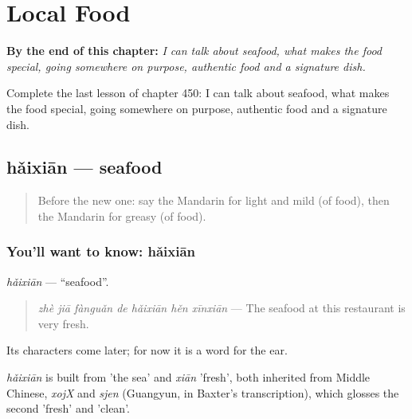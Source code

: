 
\chapter{Local Food}
\label{ch:zh-local-food}

\begin{chapteropening}
\textbf{By the end of this chapter:} \emph{I can talk about seafood, what makes the food special, going somewhere on purpose, authentic food and a signature dish.}

Complete the last lesson of chapter 450: I can talk about seafood, what makes the food special, going somewhere on purpose, authentic food and a signature dish.
\end{chapteropening}

\section[hǎixiān]{hǎixiān — seafood}

\label{lesson:ZH-C450-haixian}



\begin{quote}
Before the new one: say the Mandarin for light and mild (of food), then the Mandarin for greasy (of food).
\end{quote}

\subsection*{You'll want to know: hǎixiān}
\emph{hǎixiān} — \textquotedblleft{}seafood\textquotedblright{}.

\begin{quote}
\emph{zhè jiā fànguǎn de hǎixiān hěn xīnxiān} — The seafood at this restaurant is very fresh.
\end{quote}

Its characters come later; for now it is a word for the ear.

\begin{cousinweb}
\emph{hǎixiān} is built from  'the sea' and \emph{xiān} 'fresh', both inherited from Middle Chinese, \emph{xojX} and \emph{sjen} (Guangyun, in Baxter's transcription), which glosses the second 'fresh' and 'clean'.
\end{cousinweb}

